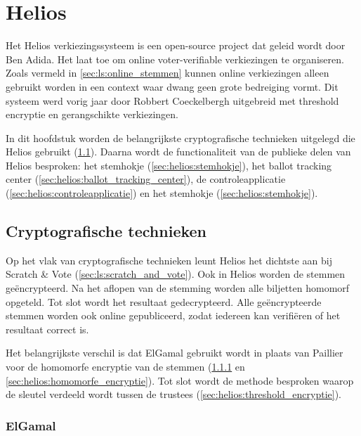 % 
%

\chapter{Helios}
\label{chap:helios}

Het Helios verkiezingssysteem is een open-source project dat geleid wordt door Ben Adida.\cite{adida_helios} Het laat toe om online voter-verifiable verkiezingen te organiseren. Zoals vermeld in \ref{sec:ls:online_stemmen} kunnen online verkiezingen alleen gebruikt worden in een context waar dwang geen grote bedreiging vormt. Dit systeem werd vorig jaar door Robbert Coeckelbergh uitgebreid met threshold encryptie en gerangschikte verkiezingen.\cite{coeckelbergh_toepassing_en_uitbreiding_van_het_helios_online_verkiezingssysteem} 

\npar In dit hoofdstuk worden de belangrijkste cryptografische technieken uitgelegd die Helios gebruikt (\ref{sec:helios:cryptografische_technieken}). Daarna wordt de functionaliteit van de publieke delen van Helios besproken: het stemhokje (\ref{sec:helios:stemhokje}), het ballot tracking center (\ref{sec:helios:ballot_tracking_center}), de controleapplicatie (\ref{sec:helios:controleapplicatie}) en het stemhokje (\ref{sec:helios:stemhokje}).

\section{Cryptografische technieken}
\label{sec:helios:cryptografische_technieken}

Op het vlak van cryptografische technieken leunt Helios het dichtste aan bij Scratch \& Vote (\ref{sec:ls:scratch_and_vote}). Ook in Helios worden de stemmen ge\"encrypteerd. Na het aflopen van de stemming worden alle biljetten homomorf opgeteld. Tot slot wordt het resultaat gedecrypteerd. Alle ge\"encrypteerde stemmen worden ook online gepubliceerd, zodat iedereen kan verifi\"eren of het resultaat correct is.

\npar Het belangrijkste verschil is dat ElGamal gebruikt wordt in plaats van Paillier voor de homomorfe encryptie van de stemmen (\ref{sec:helios:elgamal} en \ref{sec:helios:homomorfe_encryptie}). Tot slot wordt de methode besproken waarop de sleutel verdeeld wordt tussen de trustees (\ref{sec:helios:threshold_encryptie}).

\subsection{ElGamal~\cite{elgamal_elgamal}}
\label{sec:helios:elgamal}

